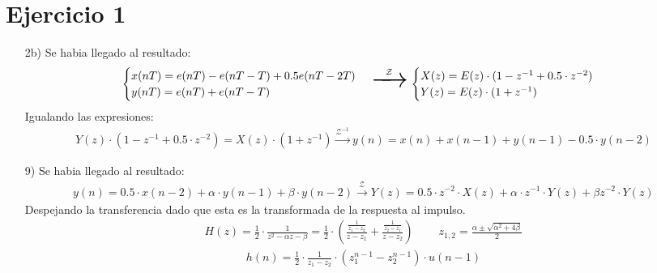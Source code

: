
\usepackage{amsmath}







\section*{Ejercicio 1}
\begin{itemize}
	\item[2b)] 
	Se habia llegado al resultado:
	\begin{align}
 \begin{cases} 
      x(nT) = e(nT) -  e(nT - T)+0.5e(nT - 2T)    \\
      y(nT) = e(nT) + e(nT - T) 
   \end{cases} 
   \begin{Huge}
   \xrightarrow{\mathcal{Z}}
   \end{Huge} 
    \begin{cases} 
      X(z) = E(z) \cdot (1-  z^{-1}+ 0.5 \cdot  z^{-2}) \\
      Y(z) = E(z)\cdot (1 +  z^{-1})
   \end{cases}
	\end{align}
Igualando las expresiones:
\begin{align}
Y(z) \cdot (1-  z^{-1}+ 0.5 \cdot  z^{-2}) = X(z) \cdot (1 +  z^{-1})\xrightarrow{\mathcal{Z}^{-1}}
y(n) = x(n) + x(n-1)+y(n-1) -0.5 \cdot y(n-2) 
\end{align}
\item[9)] 	Se habia llegado al resultado:
	\begin{align}
	y(n)= 0.5 \cdot x(n-2) + \alpha  \cdot y(n-1) + \beta  \cdot y(n-2)    \xrightarrow{\mathcal{Z}} Y(z) = 0.5 \cdot z^{-2} \cdot X(z) + \alpha  \cdot z^{-1} \cdot Y(z) + \beta z^{-2}  \cdot Y(z) 
	\end{align}
	Despejando la transferencia dado que esta es la transformada de la respuesta al impulso.
	\begin{align}
	H(z)=\frac{1}{2}\cdot \frac{1}{z^2-\alpha z - \beta} = \frac{1}{2}\cdot \left( \frac{\frac{1}{z_1-z_2}}{z-z_1} + \frac{\frac{1}{z_2-z_1}}{z-z_2} \right) \ \ \ \ \ \ \ \ \ \ z_{1,2}=\frac{\alpha \pm \sqrt{\alpha ^2 + 4\beta} }{2}
		\end{align}
		\begin{align}
	h(n)=\frac{1}{2}\cdot \frac{1}{z_1-z_2}\cdot (z_1^{n-1}-z_2^{n-1})\cdot u(n-1)
	\end{align}
\end{itemize}	

